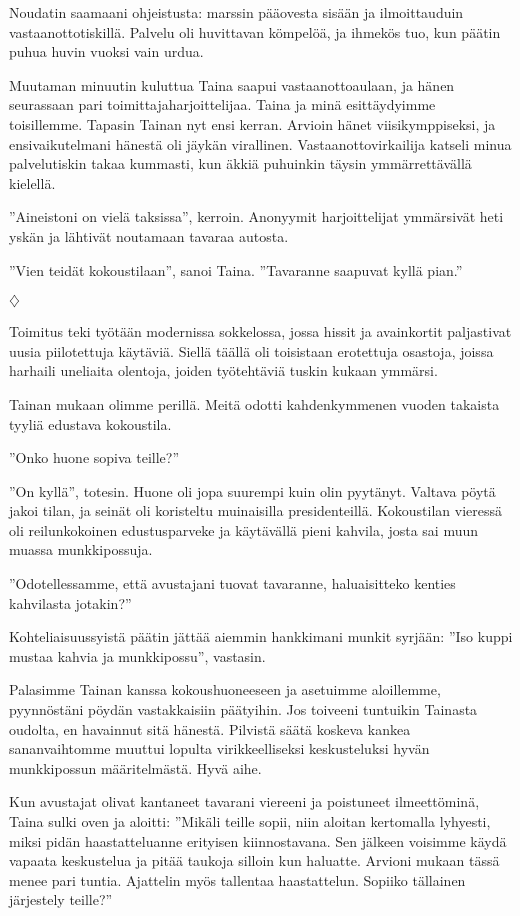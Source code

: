 ﻿\documentclass[a4paper, 12pt, finnish]{article}
\newcommand{\q}[1]{''#1''}
\def\jump{\vspace{2mm} \centerline{$\diamondsuit$} \vspace{2mm}}
\begin{document}
Noudatin saamaani ohjeistusta: marssin pääovesta sisään ja
ilmoittauduin vastaanottotiskillä. Palvelu oli huvittavan kömpelöä,
ja ihmekös tuo, kun päätin puhua huvin vuoksi
vain urdua.

Muutaman minuutin kuluttua Taina saapui vastaanottoaulaan,
ja hänen seurassaan pari toimittajaharjoittelijaa.
Taina ja minä esittäydyimme toisillemme. Tapasin Tainan nyt ensi kerran. Arvioin hänet viisikymppiseksi, ja ensivaikutelmani hänestä oli jäykän virallinen.
Vastaanottovirkailija katseli minua palvelutiskin takaa kummasti,
kun äkkiä puhuinkin täysin ymmärrettävällä kielellä.

\q{Aineistoni on vielä taksissa}, kerroin. Anonyymit harjoittelijat ymmärsivät
heti yskän ja lähtivät noutamaan tavaraa autosta.

\q{Vien teidät kokoustilaan}, sanoi Taina. \q{Tavaranne saapuvat kyllä pian.}


\jump


Toimitus teki työtään modernissa sokkelossa, jossa hissit ja
avainkortit paljastivat uusia piilotettuja käytäviä. Siellä täällä
oli toisistaan erotettuja osastoja, joissa harhaili uneliaita
olentoja, joiden työtehtäviä tuskin kukaan ymmärsi.

Tainan mukaan olimme perillä. Meitä odotti kahdenkymmenen vuoden
takaista tyyliä edustava kokoustila.

\q{Onko huone sopiva teille?}

\q{On kyllä}, totesin. Huone oli jopa suurempi kuin olin pyytänyt.
Valtava pöytä jakoi tilan, ja seinät oli koristeltu muinaisilla
presidenteillä. Kokoustilan vieressä oli reilunkokoinen
edustusparveke ja käytävällä pieni kahvila, josta sai muun
muassa munkkipossuja.

\q{Odotellessamme, että avustajani tuovat tavaranne,
haluaisitteko kenties kahvilasta jotakin?}

Kohteliaisuussyistä päätin
jättää aiemmin hankkimani munkit syrjään: \q{Iso kuppi mustaa kahvia
ja munkkipossu}, vastasin.

Palasimme Tainan kanssa kokoushuoneeseen ja asetuimme aloillemme,
pyynnöstäni pöydän vastakkaisiin päätyihin.
Jos toiveeni tuntuikin Tainasta oudolta, en havainnut sitä hänestä.
Pilvistä säätä koskeva kankea sananvaihtomme muuttui lopulta
virikkeelliseksi keskusteluksi hyvän munkkipossun määritelmästä.
Hyvä aihe.

Kun avustajat olivat kantaneet tavarani viereeni ja poistuneet
ilmeettöminä, Taina sulki oven ja aloitti:
\q{Mikäli teille sopii, niin aloitan kertomalla lyhyesti,
miksi pidän haastatteluanne erityisen kiinnostavana. Sen jälkeen
voisimme käydä vapaata keskustelua ja pitää taukoja silloin kun haluatte.
Arvioni mukaan tässä menee pari tuntia. Ajattelin myös tallentaa
haastattelun. Sopiiko tällainen järjestely teille?}
\end{document}
